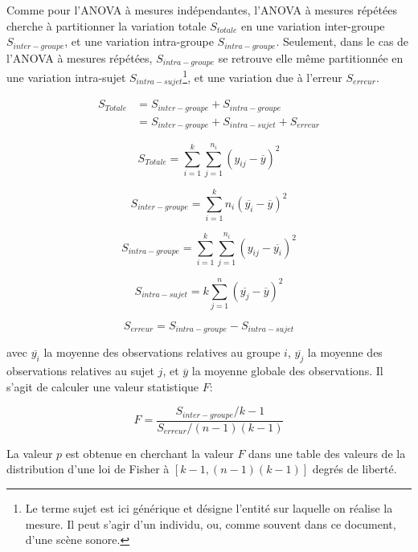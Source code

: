 Comme pour l'ANOVA à mesures indépendantes, l'ANOVA à mesures répétées cherche à partitionner la variation totale $S_{totale}$ en une variation inter-groupe $S_{inter-groupe}$, et une variation intra-groupe $S_{intra-groupe}$. Seulement, dans le cas de l'ANOVA à mesures répétées, $S_{intra-groupe}$ se retrouve elle même partitionnée en une variation intra-sujet $S_{intra-sujet}$\footnote{Le terme sujet est ici générique et désigne l'entité sur laquelle on réalise la mesure. Il peut s'agir d'un individu, ou, comme souvent dans ce document, d'une scène sonore.}, et une variation due à l'erreur $S_{erreur}$.

\begin{align}
S_{Totale} &= S_{inter-groupe} + S_{intra-groupe} \\
           &= S_{inter-groupe} + S_{intra-sujet} + S_{erreur}
\end{align}

\begin{equation}
S_{Totale}=\sum_{i=1}^k \sum_{j=1}^{n_i} (y_{ij}-\overline{y})^2
\end{equation}

\begin{equation}
S_{inter-groupe}=\sum_{i=1}^k n_i(\overline{y_i} - \overline{y})^2 
\end{equation}

\begin{equation}
S_{intra-groupe}=\sum_{i=1}^k \sum_{j=1}^{n_i} (y_{ij} - \overline{y_i})^2
\end{equation}

\begin{equation}
S_{intra-sujet}= k \sum_{j=1}^n (\overline{y_j} - \overline{y})^2 
\end{equation}

\begin{equation}
S_{erreur}= S_{intra-groupe} - S_{intra-sujet}
\end{equation}

avec $\overline{y_i}$ la moyenne des observations relatives au groupe $i$, $\overline{y_j}$ la moyenne des observations relatives au sujet $j$, et $\overline{y}$ la moyenne globale des observations. Il s'agit de calculer une valeur statistique $F$:

\begin{equation}
F=\dfrac{S_{inter-groupe}/k-1}{S_{erreur}/(n-1)(k-1)}
\end{equation}

La valeur $p$ est obtenue en cherchant la valeur $F$ dans une table des valeurs de la distribution d'une loi de Fisher à $[k-1,(n-1)(k-1)]$ degrés de liberté.

